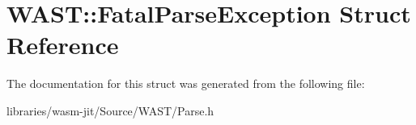 \hypertarget{struct_w_a_s_t_1_1_fatal_parse_exception}{}\section{W\+A\+ST\+:\+:Fatal\+Parse\+Exception Struct Reference}
\label{struct_w_a_s_t_1_1_fatal_parse_exception}


The documentation for this struct was generated from the following file\+:\begin{DoxyCompactItemize}
\item 
libraries/wasm-\/jit/\+Source/\+W\+A\+S\+T/Parse.\+h\end{DoxyCompactItemize}
